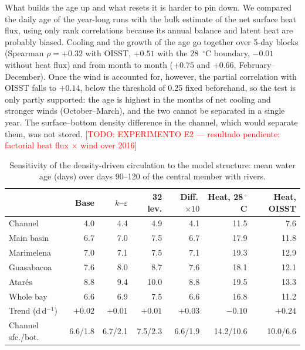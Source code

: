 \documentclass[a4paper,fleqn]{ems-dc}
\newcommand{\todo}[1]{\textcolor{red}{[TODO: #1]}}
\begin{document}
What builds the age up and what resets it is harder to pin down. We compared the daily age
of the year-long runs with the bulk estimate of the net surface heat flux, using only rank
correlations because its annual balance and latent heat are probably biased. Cooling and the
growth of the age go together over 5-day blocks (Spearman $\rho = +0.32$ with OISST, $+0.51$
with the 28~$^\circ$C boundary, $-0.01$ without heat flux) and from month to month ($+0.75$
and $+0.66$, February--December). Once the wind is accounted for, however, the partial
correlation with OISST falls to $+0.14$, below the threshold of 0.25 fixed beforehand, so the
test is only partly supported: the age is highest in the months of net cooling and stronger
winds (October--March), and the two cannot be separated in a single year. The
surface--bottom density difference in the channel, which would separate them, was not
stored. \todo{EXPERIMENTO E2 --- resultado pendiente: factorial heat flux $\times$ wind over 2016}

\begin{table}[!t]
\centering\small
\caption{Sensitivity of the density-driven circulation to the model structure: mean water
age (days) over days 90--120 of the central member with rivers.}\label{tab:robust}
\footnotesize\setlength{\tabcolsep}{4pt}
\begin{tabular}{lrrrrrr}
\toprule
& Base & $k$--$\varepsilon$ & 32 lev. & Diff.\,$\times10$ & Heat, 28\,$^\circ$C &
Heat, OISST\\
\midrule
Channel & 4.0 & 4.4 & 4.9 & 4.1 & 11.5 & 7.6\\
Main basin & 6.7 & 7.0 & 7.5 & 6.7 & 17.9 & 11.8\\
Marimelena & 7.0 & 7.1 & 7.5 & 7.1 & 19.3 & 12.9\\
Guasabacoa & 7.6 & 8.0 & 8.7 & 7.6 & 18.1 & 12.1\\
Atar\'es & 8.8 & 9.4 & 10.0 & 8.8 & 19.5 & 13.3\\
Whole bay & 6.6 & 6.9 & 7.5 & 6.6 & 16.8 & 11.2\\
Trend (d\,d$^{-1}$) & $+0.02$ & $+0.01$ & $+0.01$ & $+0.03$ & $-0.10$ & $+0.24$\\
Channel sfc./bot. & 6.6/1.8 & 6.7/2.1 & 7.5/2.3 & 6.6/1.9 & 14.2/10.6 & 10.0/6.6\\
\bottomrule
\end{tabular}
\end{table}
\end{document}
